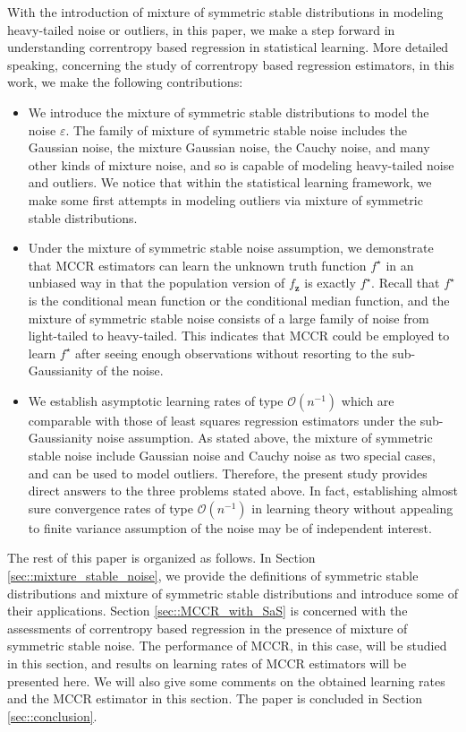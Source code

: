 \documentclass[11pt]{article}
\begin{document}
With the introduction of mixture of symmetric stable distributions in modeling heavy-tailed noise or outliers, in this paper, we make a step forward in understanding correntropy based regression in statistical learning. More detailed speaking, concerning the study of correntropy based regression estimators, in this work, we make the following contributions:
\begin{itemize}
	\item We introduce the mixture of symmetric stable distributions to model the noise $\varepsilon$. The family of mixture of symmetric stable noise includes the Gaussian noise, the mixture Gaussian noise, the Cauchy noise, and many other kinds of mixture noise, and so is capable of modeling heavy-tailed noise and outliers. We notice that within the statistical learning framework, we make some first attempts in modeling outliers via mixture of symmetric stable distributions.  
	\item Under the mixture of symmetric stable noise assumption, we demonstrate that MCCR estimators can learn the unknown truth function $f^\star$ in an unbiased way in that the population version of $f_\mathbf{z}$ is exactly $f^\star$. Recall that $f^\star$ is the conditional mean function or the conditional median function, and the mixture of symmetric stable noise consists of a large family of noise from light-tailed to heavy-tailed. This indicates that MCCR could be employed to learn $f^\star$ after seeing enough observations without resorting to the sub-Gaussianity of the noise. 
	\item We establish asymptotic learning rates of type $\mathcal{O}(n^{-1})$ which are comparable with those of least squares regression estimators under the sub-Gaussianity noise assumption. As stated above, the mixture of symmetric stable noise include Gaussian noise and Cauchy noise as two special cases, and can be used to model outliers. Therefore, the present study provides direct answers to the three problems stated above. In fact, establishing almost sure convergence rates of type $\mathcal{O}(n^{-1})$ in learning theory without appealing to finite variance assumption of the noise may be of independent interest. 
\end{itemize}


The rest of this paper is organized as follows. In Section \ref{sec::mixture_stable_noise}, we provide the definitions of symmetric stable distributions and mixture of symmetric stable distributions and introduce some of their applications. Section \ref{sec::MCCR_with_SaS} is concerned with the assessments of correntropy based regression in the presence of mixture of symmetric stable noise. The performance of MCCR, in this case, will be studied in this section, and results on learning rates of MCCR estimators will be presented here. We will also give some comments on the obtained learning rates and the MCCR estimator in this section. The paper is concluded in Section \ref{sec::conclusion}.   
\end{document}
